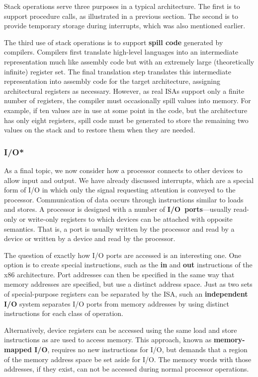 Stack operations serve three purposes in a typical architecture.  The
first is to support procedure calls, as illustrated in a previous
section.  The second is to provide temporary storage during
interrupts, which was also mentioned earlier.  

The third use of stack operations is to support {\bf spill code}
generated by compilers.  Compilers first translate high-level
languages into an intermediate representation much like assembly code
but with an extremely large (theoretically infinite) register set.
The final translation step translates this intermediate representation
into assembly code for the target architecture, assigning
architectural registers as necessary.  However, as real ISAs support
only a finite number of registers, the compiler must occasionally
spill values into memory.  For example, if ten values are in use at
some point in the code, but the architecture has only eight registers,
spill code must be generated to store the remaining two values on the
stack and to restore them when they are needed.\\


\subsubsection{I/O*}

As a final topic, we now consider how a processor
connects to other devices to allow input and output.  We have already
discussed interrupts, which are a special form of I/O in which only
the signal requesting attention is conveyed to the processor.
Communication of data occurs through instructions similar to loads and
stores.  A processor is designed with a number of \mbox{{\bf I/O
ports}---usually} read-only or write-only registers to which devices
can be attached with opposite semantics.  That is, a port is usually
written by the processor and read by a device or written by a device
and read by the processor.

The question of exactly how I/O ports are accessed is an interesting
one.  One option is to create special instructions, such as the {\bf
in} and {\bf out} instructions of the x86 architecture.  Port
addresses can then be specified in the same way that memory addresses
are specified, but use a distinct address space.  Just as two sets of
special-purpose registers can be separated by the ISA, such an {\bf
independent I/O} system separates I/O ports from memory addresses by
using distinct instructions for each class of operation.

Alternatively, device registers can be accessed using the same load and store
instructions as are used to access memory.  This approach, known as
{\bf memory-mapped I/O}, requires no new instructions for I/O, but
demands that a region of the memory address space be set aside for
I/O.  The memory words with those addresses, if they exist, can not be
accessed during normal processor operations.

\vfill

\pagebreak

